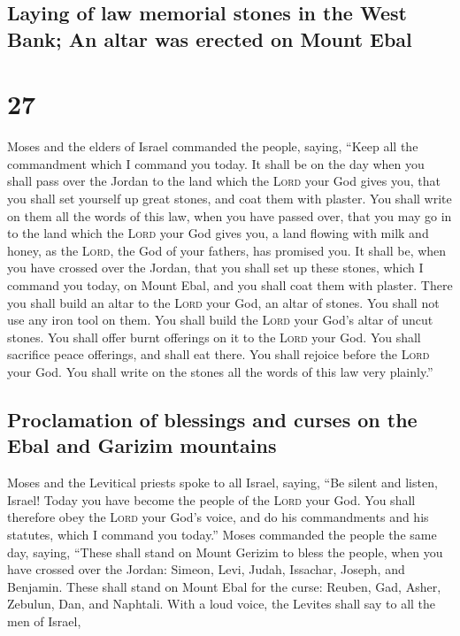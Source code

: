 \hypertarget{laying-of-law-memorial-stones-in-the-west-bank-an-altar-was-erected-on-mount-ebal}{%
\subsection{Laying of law memorial stones in the West Bank; An altar was
erected on Mount
Ebal}\label{laying-of-law-memorial-stones-in-the-west-bank-an-altar-was-erected-on-mount-ebal}}

\hypertarget{section-26}{%
\section{27}\label{section-26}}

 Moses and the elders of Israel commanded the people,
saying, ``Keep all the commandment which I command you today.
 It shall be on the day when you shall pass over the
Jordan to the land which the \textsc{Lord} your God gives you, that you
shall set yourself up great stones, and coat them with plaster.
 You shall write on them all the words of this law, when
you have passed over, that you may go in to the land which the
\textsc{Lord} your God gives you, a land flowing with milk and honey, as
the \textsc{Lord}, the God of your fathers, has promised you.
 It shall be, when you have crossed over the Jordan, that
you shall set up these stones, which I command you today, on Mount Ebal,
and you shall coat them with plaster.  There you shall
build an altar to the \textsc{Lord} your God, an altar of stones. You
shall not use any iron tool on them.  You shall build the
\textsc{Lord} your God's altar of uncut stones. You shall offer burnt
offerings on it to the \textsc{Lord} your God.  You shall
sacrifice peace offerings, and shall eat there. You shall rejoice before
the \textsc{Lord} your God.  You shall write on the stones
all the words of this law very plainly.''

\hypertarget{proclamation-of-blessings-and-curses-on-the-ebal-and-garizim-mountains}{%
\subsection{Proclamation of blessings and curses on the Ebal and Garizim
mountains}\label{proclamation-of-blessings-and-curses-on-the-ebal-and-garizim-mountains}}

 Moses and the Levitical priests spoke to all Israel,
saying, ``Be silent and listen, Israel! Today you have become the people
of the \textsc{Lord} your God.  You shall therefore obey
the \textsc{Lord} your God's voice, and do his commandments and his
statutes, which I command you today.''  Moses commanded
the people the same day, saying,  ``These shall stand on
Mount Gerizim to bless the people, when you have crossed over the
Jordan: Simeon, Levi, Judah, Issachar, Joseph, and Benjamin.
 These shall stand on Mount Ebal for the curse: Reuben,
Gad, Asher, Zebulun, Dan, and Naphtali.  With a loud
voice, the Levites shall say to all the men of Israel,

